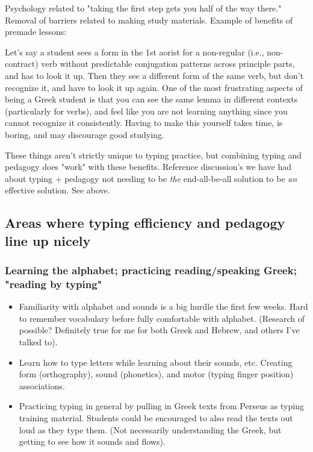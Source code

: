 \documentclass[11pt]{article}
\begin{document}
Psychology related to "taking the first step gets you half of the way there." Removal of barriers related to making study materials. Example of benefits of premade lessons:

Let's say a student sees a form in the 1st aorist for a non-regular (i.e., non-contract) verb without predictable conjugation patterns across principle parts, and has to look it up. Then they see a different form of the same verb, but don't recognize it, and have to look it up again. One of the most frustrating aspects of being a Greek student is that you can see the same lemma in different contexts (particularly for verbs), and feel like you are not learning anything since you cannot recognize it consistently. Having to make this yourself takes time, is boring, and may discourage good studying.

These things aren't strictly unique to typing practice, but combining typing and pedagogy does "work" with these benefits. Reference discussion's we have had about typing + pedagogy not needing to be \emph{the} end-all-be-all solution to be \emph{an} effective solution. See above.

\subsection{Areas where typing efficiency and pedagogy line up nicely}
\label{sec:org9790e60}

\subsubsection{Learning the alphabet; practicing reading/speaking Greek; "reading by typing"}
\label{sec:org23b5138}

\begin{itemize}
\item Familiarity with alphabet and sounds is a big hurdle the first few weeks. Hard to remember vocabulary before fully comfortable with alphabet. (Research of possible? Definitely true for me for both Greek and Hebrew, and others I've talked to).
\item Learn how to type letters while learning about their sounds, etc. Creating form (orthography), sound (phonetics), and motor (typing finger position) associations.
\item Practicing typing in general by pulling in Greek texts from Perseus as typing training material. Students could be encouraged to also read the texts out loud as they type them. (Not necessarily understanding the Greek, but getting to see how it sounds and flows).
\end{itemize}
\end{document}
